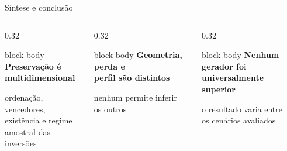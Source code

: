 \begin{frame}{Síntese e conclusão}
  \vspace{-0.04cm}
  \begin{columns}[T,onlytextwidth]
    \begin{column}{0.32\textwidth}
      \begin{beamercolorbox}[wd=\linewidth,sep=.12cm,rounded=true]{block body}
        \centering\bfseries\fontsize{10.0}{12.0}\selectfont\color{CoInfoBlue}
        Preservação é\\multidimensional\par\vspace{.07cm}
        \mdseries\fontsize{8.3}{9.9}\selectfont\color{CoInfoInk}
        ordenação, vencedores,\\existência e regime\\amostral das inversões
      \end{beamercolorbox}
    \end{column}
    \begin{column}{0.32\textwidth}
      \begin{beamercolorbox}[wd=\linewidth,sep=.12cm,rounded=true]{block body}
        \centering\bfseries\fontsize{10.0}{12.0}\selectfont\color{CoInfoBlue}
        Geometria, perda e\\perfil são distintos\par\vspace{.07cm}
        \mdseries\fontsize{8.3}{9.9}\selectfont\color{CoInfoInk}
        nenhum permite inferir\\os outros
      \end{beamercolorbox}
    \end{column}
    \begin{column}{0.32\textwidth}
      \begin{beamercolorbox}[wd=\linewidth,sep=.12cm,rounded=true]{block body}
        \centering\bfseries\fontsize{10.0}{12.0}\selectfont\color{CoInfoBlue}
        Nenhum gerador foi\\universalmente superior\par\vspace{.07cm}
        \mdseries\fontsize{8.3}{9.9}\selectfont\color{CoInfoInk}
        o resultado varia entre\\os cenários avaliados
      \end{beamercolorbox}
    \end{column}
  \end{columns}


\end{frame}
